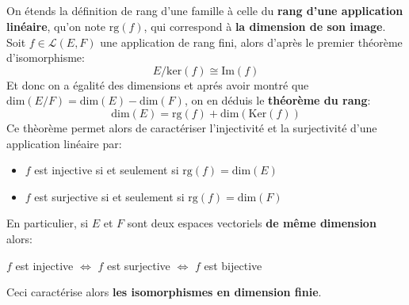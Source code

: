 \subsection*{}
On étends la définition de rang d'une famille à celle du \textbf{rang d'une application linéaire}, qu'on note \(\text{rg}(f)\), qui correspond à \textbf{la dimension de son image}. Soit \(f \in \mathcal{L}(E, F)\) une application de rang fini, alors d'après le premier théorème d'isomorphisme:
\[ 
   E/\text{ker}(f) \cong \text{Im}(f) 
\]
Et donc on a égalité des dimensions et aprés avoir montré que \( \text{dim}(E/F) = \text{dim}(E) - \text{dim}(F) \), on en déduis le \textbf{théorème du rang}:
\[ 
   \text{dim}(E) = \text{rg}(f) + \text{dim}(\text{Ker}(f))
\]
Ce thèorème permet alors de caractériser l'injectivité et la surjectivité d'une application linéaire par:
\begin{itemize}
   \item \(f\) est injective si et seulement si \(\text{rg}(f) = \text{dim}(E)\)
   \item \(f\) est surjective si et seulement si \(\text{rg}(f) = \text{dim}(F)\)
\end{itemize}
En particulier, si \(E\) et \(F\) sont deux espaces vectoriels \textbf{de même dimension} alors:
\begin{center}
   \(f\) est injective \(\Longleftrightarrow\) \(f\) est surjective \(\Longleftrightarrow\) \(f\) est bijective
\end{center}
Ceci caractérise alors \textbf{les isomorphismes en dimension finie}.
\subsection*{}

